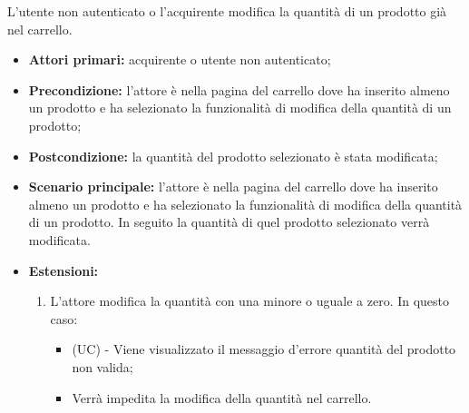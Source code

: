
L'utente non autenticato o l'acquirente modifica la quantità di un prodotto già nel carrello.
\begin{itemize}
    \item \textbf{Attori primari:} acquirente o utente non autenticato;
    \item \textbf{Precondizione:} l'attore è nella pagina del carrello dove ha inserito almeno un prodotto e ha selezionato la funzionalità di modifica della quantità di un prodotto;
    \item \textbf{Postcondizione:} la quantità del prodotto selezionato è stata modificata;
    \item \textbf{Scenario principale:} l'attore è nella pagina del carrello dove ha inserito almeno un prodotto e ha selezionato la funzionalità di modifica della quantità di un prodotto. In seguito la quantità di quel prodotto selezionato verrà modificata.
    \item \textbf{Estensioni:}
    \begin{enumerate}[label=\lett]
        \item L'attore modifica la quantità con una minore o uguale a zero. In questo caso:
        \begin{itemize}
            \item (UC) - Viene visualizzato il messaggio d'errore quantità del prodotto non valida;
            \item Verrà impedita la modifica della quantità nel carrello.
        \end{itemize}
    \end{enumerate}
\end{itemize}

